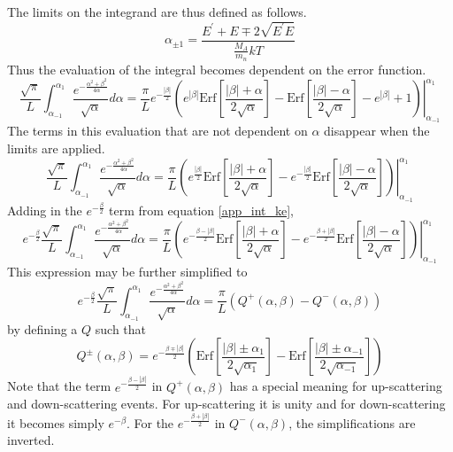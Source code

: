 The limits on the integrand are thus defined as follows.
\begin{equation}
\label{app_alpha_limits}
\alpha_{\pm 1} = \frac{E^\prime + E \mp 2\sqrt{E^\prime E}}{\frac{M_A}{m_n}kT}
\end{equation}
Thus the evaluation of the integral becomes dependent on the error function.
\begin{equation}
\label{app_int_ke_3}
\frac{\sqrt{\pi}}{L} \int_{\alpha_{-1}}^{\alpha_1} \frac{e^{-\frac{\alpha^2 + \beta^2}{4\alpha}}}{\sqrt{\alpha}} d\alpha = 
    \frac{\pi}{L} e^{-\frac{|\beta|}{2}} \left. \left(
    e^{|\beta|} \mbox{Erf}\left[\frac{|\beta| + \alpha}{2\sqrt{\alpha}}\right] - 
    \mbox{Erf}\left[\frac{|\beta| - \alpha}{2\sqrt{\alpha}}\right] - 
    e^{|\beta|} + 1
    \right) \right|_{\alpha_{-1}}^{\alpha_1}
\end{equation}
The terms in this evaluation that are not dependent on $\alpha$ disappear when the limits are applied.
\begin{equation}
\label{app_int_ke_4}
\frac{\sqrt{\pi}}{L} \int_{\alpha_{-1}}^{\alpha_1} \frac{e^{-\frac{\alpha^2 + \beta^2}{4\alpha}}}{\sqrt{\alpha}} d\alpha = 
    \frac{\pi}{L} \left. \left(
    e^{\frac{|\beta|}{2}}  \mbox{Erf}\left[\frac{|\beta| + \alpha}{2\sqrt{\alpha}}\right] - 
    e^{-\frac{|\beta|}{2}} \mbox{Erf}\left[\frac{|\beta| - \alpha}{2\sqrt{\alpha}}\right] 
    \right) \right|_{\alpha_{-1}}^{\alpha_1}
\end{equation}
Adding in the $e^{-\frac{\beta}{2}}$ term from equation \ref{app_int_ke}, 
\begin{equation}
\label{app_int_ke_5}
e^{-\frac{\beta}{2}} \frac{\sqrt{\pi}}{L} \int_{\alpha_{-1}}^{\alpha_1} \frac{e^{-\frac{\alpha^2 + \beta^2}{4\alpha}}}{\sqrt{\alpha}} d\alpha = 
    \frac{\pi}{L} \left. \left(
    e^{-\frac{\beta - |\beta|}{2}} \mbox{Erf}\left[\frac{|\beta| + \alpha}{2\sqrt{\alpha}}\right] - 
    e^{-\frac{\beta + |\beta|}{2}} \mbox{Erf}\left[\frac{|\beta| - \alpha}{2\sqrt{\alpha}}\right] 
    \right) \right|_{\alpha_{-1}}^{\alpha_1}
\end{equation}
This expression may be further simplified to 
\begin{equation}
\label{app_int_ke_6}
e^{-\frac{\beta}{2}} \frac{\sqrt{\pi}}{L} \int_{\alpha_{-1}}^{\alpha_1} \frac{e^{-\frac{\alpha^2 + \beta^2}{4\alpha}}}{\sqrt{\alpha}} d\alpha = 
    \frac{\pi}{L} \left(Q^+(\alpha, \beta) - Q^-(\alpha, \beta) \right) 
\end{equation}
by defining a $Q$ such that
\begin{equation}
\label{app_Q_pm}
Q^\pm(\alpha, \beta) = e^{-\frac{\beta \mp |\beta|}{2}} \left( 
    \mbox{Erf}\left[\frac{|\beta| \pm \alpha_1}{2\sqrt{\alpha_1}}\right] -
    \mbox{Erf}\left[\frac{|\beta| \pm \alpha_{-1}}{2\sqrt{\alpha_{-1}}}\right]  
    \right) 
\end{equation}
Note that the term $e^{-\frac{\beta - |\beta|}{2}}$ in $Q^+(\alpha, \beta)$ has a special meaning 
for up-scattering and down-scattering events.  For up-scattering it is unity and for down-scattering it 
becomes simply $e^{-\beta}$.  For the $e^{-\frac{\beta + |\beta|}{2}}$ in $Q^-(\alpha, \beta)$, 
the simplifications are inverted.


